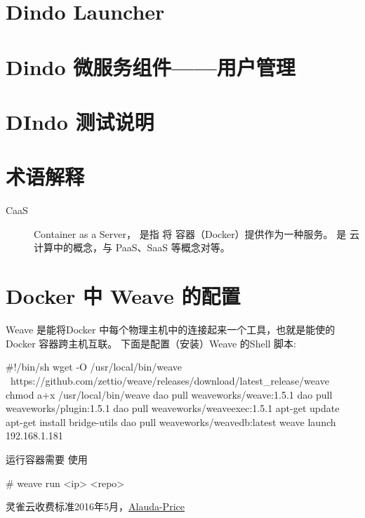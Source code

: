 \documentclass{dingo}
\begin{document}
  \section{Dindo Launcher}

  \section{Dindo 微服务组件——用户管理}

  \section{DIndo 测试说明}

  \newpage
  \begin{appendix}
	  	\section{术语解释}
	  	\label{section:term}
			\begin{description}
				\item[CaaS] Container as a Server， 是指 将 容器（Docker）提供作为一种服务。
					是 云计算中的概念，与 PaaS、SaaS 等概念对等。
			\end{description}

	  	\section{Docker 中 Weave  的配置} %
	  	\label{section:dockerNweave}
	  	Weave 是能将Docker 中每个物理主机中的连接起来一个工具，也就是能使的 Docker 容器跨主机互联。
	  	下面是配置（安装）Weave 的Shell 脚本:
	  	\begin{shell}[caption=Weave 安装]
#!/bin/sh
wget -O /usr/local/bin/weave \
https://github.com/zettio/weave/releases/download/latest_release/weave
chmod a+x /usr/local/bin/weave
dao pull weaveworks/weave:1.5.1
dao pull weaveworks/plugin:1.5.1
dao pull weaveworks/weaveexec:1.5.1
apt-get update
apt-get install bridge-utils
dao pull weaveworks/weavedb:latest
weave launch 192.168.1.181
	  	\end{shell}
	  	运行容器需要 使用
	  	\begin{shell}
# weave run <ip> <repo>
	  	\end{shell}

	  	 \begin{thebibliography}{}
		 灵雀云收费标准2016年5月，\href{http://www.alauda.cn/price/}{Alauda-Price}
	  	 \end{thebibliography}
  \end{appendix}
\end{document}
